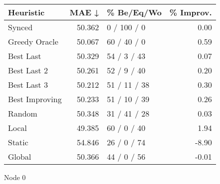 \begin{tabular}{lrlr}
\toprule
\textbf{Heuristic} & \textbf{MAE ↓} & \textbf{\% Be/Eq/Wo} & \textbf{\% Improv.} \\
\midrule
            Synced &         50.362 &          0 / 100 / 0 &                0.00 \\
     Greedy Oracle &         50.067 &          60 / 40 / 0 &                0.59 \\
         Best Last &         50.329 &          54 / 3 / 43 &                0.07 \\
       Best Last 2 &         50.261 &          52 / 9 / 40 &                0.20 \\
       Best Last 3 &         50.212 &         51 / 11 / 38 &                0.30 \\
    Best Improving &         50.233 &         51 / 10 / 39 &                0.26 \\
            Random &         50.348 &         31 / 41 / 28 &                0.03 \\
             Local &         49.385 &          60 / 0 / 40 &                1.94 \\
            Static &         54.846 &          26 / 0 / 74 &               -8.90 \\
            Global &         50.366 &          44 / 0 / 56 &               -0.01 \\
\bottomrule
\end{tabular}
\caption{Node 0}
\label{tab:iid_lr01_le2_bs4_0}
